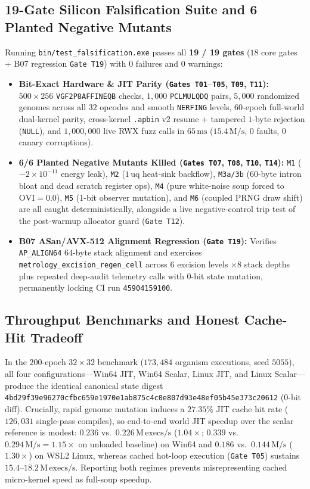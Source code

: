 \documentclass[11pt,reqno]{amsart}
\theoremstyle{plain}
\theoremstyle{definition}
\theoremstyle{remark}
\newcommand{\code}[1]{{\footnotesize\nolinkurl{#1}}}
\newcommand{\tcode}[1]{{\scriptsize\nolinkurl{#1}}}
\begin{document}
\subsection{19-Gate Silicon Falsification Suite and 6 Planted Negative Mutants}
Running \code{bin/test_falsification.exe} passes all \textbf{19 / 19 gates} ($18$ core gates + B07 regression \code{Gate T19}) with $0$ failures and $0$ warnings:
\begin{itemize}[leftmargin=1.5em,itemsep=2pt]
  \item \textbf{Bit-Exact Hardware \& JIT Parity (\tcode{Gates T01}--\tcode{T05}, \tcode{T09}, \tcode{T11}):} $500 \times 256$ \code{VGF2P8AFFINEQB} checks, $1{,}000$ \code{PCLMULQDQ} pairs, $5{,}000$ randomized genomes across all $32$ opcodes and smooth \code{NERFING} levels, $60$-epoch full-world dual-kernel parity, cross-kernel \code{.apbin} v2 resume + tampered $1$-byte rejection (\code{NULL}), and $1{,}000{,}000$ live RWX fuzz calls in $65\,\mathrm{ms}$ ($15.4\,\mathrm{M/s}$, $0$ faults, $0$ canary corruptions).
  \item \textbf{6/6 Planted Negative Mutants Killed (\tcode{Gates T07}, \tcode{T08}, \tcode{T10}, \tcode{T14}):} \code{M1} ($-2\times 10^{-11}$ energy leak), \code{M2} ($1\,\mathrm{uq}$ heat-sink backflow), \code{M3a/3b} ($60$-byte intron bloat and dead scratch register ops), \code{M4} (pure white-noise soup forced to $\mathrm{OVI}=0.0$), \code{M5} ($1$-bit observer mutation), and \code{M6} (coupled PRNG draw shift) are all caught deterministically, alongside a live negative-control trip test of the post-warmup allocator guard (\code{Gate T12}).
  \item \textbf{B07 ASan/AVX-512 Alignment Regression (\tcode{Gate T19}):} Verifies \code{AP_ALIGN64} $64$-byte stack alignment and exercises \code{metrology_excision_regen_cell} across $6$ excision levels $\times 8$ stack depths plus repeated deep-audit telemetry calls with $0$-bit state mutation, permanently locking CI run \code{45904159100}.
\end{itemize}

\subsection{Throughput Benchmarks and Honest Cache-Hit Tradeoff}
In the $200$-epoch $32 \times 32$ benchmark ($173{,}484$ organism executions, seed $5055$), all four configurations---Win64 JIT, Win64 Scalar, Linux JIT, and Linux Scalar---produce the identical canonical state digest \code{4bd29f39e96270cfbc659e1970e1ab875c4c0e807d93e48ef05b45e373c20612} ($0$-bit diff). Crucially, rapid genome mutation induces a $27.35\%$ JIT cache hit rate ($126{,}031$ single-pass compiles), so end-to-end world JIT speedup over the scalar reference is modest: $0.236$ vs.\ $0.226\,\mathrm{M\,execs/s}$ ($1.04\times$; $0.339$ vs.\ $0.294\,\mathrm{M/s} = 1.15\times$ on unloaded baseline) on Win64 and $0.186$ vs.\ $0.144\,\mathrm{M/s}$ ($1.30\times$) on WSL2 Linux, whereas cached hot-loop execution (\code{Gate T05}) sustains $15.4$--$18.2\,\mathrm{M\,execs/s}$. Reporting both regimes prevents misrepresenting cached micro-kernel speed as full-soup speedup.
\end{document}
